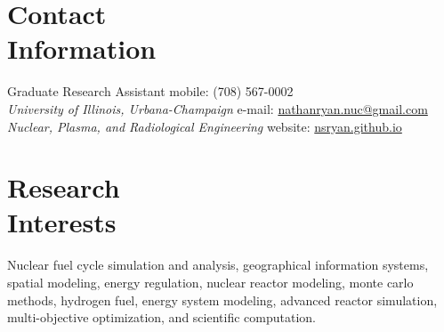\documentclass[margin,line]{resume}
\begin{document}
\begin{resume}

%


    \section{\mysidestyle Contact\\Information}
    Graduate Research Assistant \hfill mobile: (708) 567-0002 \vspace{0mm}\\\vspace{0mm}%
        \textsl{University of Illinois, Urbana-Champaign}
        \hfill e-mail: \href{mailto:nathanryan.nuc@gmail.com}{nathanryan.nuc@gmail.com}       \vspace{0mm}\\\vspace{0mm}%
    \textsl{Nuclear, Plasma, and Radiological Engineering}
        \hfill website: \href{https://nsryan.github.io}{nsryan.github.io}     \vspace{0mm}\\\vspace{0mm}%

    \section{\mysidestyle Research\\Interests}
                Nuclear fuel cycle simulation and analysis, geographical information systems, spatial modeling, energy regulation, nuclear reactor modeling, monte carlo methods, hydrogen fuel, energy system modeling, advanced reactor simulation, multi-objective optimization, and scientific computation.

\end{resume}
\end{document}
